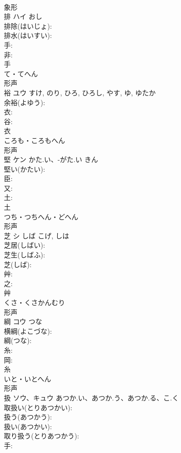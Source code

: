 \documentclass[8pt]{extreport}
\begin{document}
\begin{CJK}{UTF8}{min}
\\	象形 
\\	排	ハイ		おし	
\\	排除(はいじょ): 
\\	排水(はいすい): 
\\	手: 
\\	非: 
\\	手	
\\	て・てへん	
\\	形声 
\\	裕	ユウ		すけ, のり, ひろ, ひろし, やす, ゆ, ゆたか	
\\	余裕(よゆう): 
\\	衣: 
\\	谷: 
\\	衣	
\\	ころも・ころもへん	
\\	形声 
\\	堅	ケン	かた.い、-がた.い	きん	
\\	堅い(かたい): 
\\	臣: 
\\	又: 
\\	土: 
\\	土	
\\	つち・つちへん・どへん	
\\	形声 
\\	芝	シ	しば	こげ, しは	
\\	芝居(しばい): 
\\	芝生(しばふ): 
\\	芝(しば): 
\\	艸: 
\\	之: 
\\	艸	
\\	くさ・くさかんむり	
\\	形声 
\\	綱	コウ	つな		
\\	横綱(よこづな): 
\\	綱(つな): 
\\	糸: 
\\	岡: 
\\	糸	
\\	いと・いとへん	
\\	形声 
\\	扱	ソウ、キュウ	あつか.い、あつか.う、あつか.る、こ.く		
\\	取扱い(とりあつかい): 
\\	扱う(あつかう): 
\\	扱い(あつかい): 
\\	取り扱う(とりあつかう): 
\\	手: 

\end{CJK}
\end{document}
